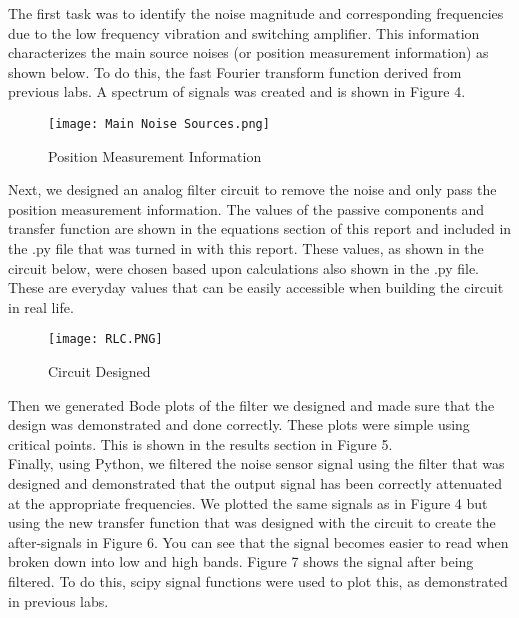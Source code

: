 \documentclass[12pt]{report}
\begin{document}
\noindent The first task was to identify the noise magnitude and corresponding frequencies due to the low frequency vibration and switching amplifier. This information characterizes the main source noises (or position measurement information) as shown below. To do this, the fast Fourier transform function derived from previous labs. A spectrum of signals was created and is shown in Figure 4. \\

\newpage 

\begin{figure}[ht]
\begin{center}
\texttt{[image: Main Noise Sources.png]}
\caption{Position Measurement Information}
\end{center}
\end{figure}


\noindent Next, we designed an analog filter circuit to remove the noise and only pass the position measurement information. The values of the passive components and transfer function are shown in the equations section of this report and included in the .py file that was turned in with this report. These values, as shown in the circuit below, were chosen based upon calculations also shown in the .py file. These are everyday values that can be easily accessible when building the circuit in real life. \\

\newpage

\begin{figure}[ht]
\begin{center}
\texttt{[image: RLC.PNG]}
\caption{Circuit Designed}
\end{center}
\end{figure}

\noindent Then we generated Bode plots of the filter we designed and made sure that the design was demonstrated and done correctly. These plots were simple using critical points. This is shown in the results section in Figure 5.\\ 

\noindent Finally, using Python, we filtered the noise sensor signal using the filter that was designed and demonstrated that the output signal has been correctly attenuated at the appropriate frequencies. We plotted the same signals as in Figure 4 but using the new transfer function that was designed with the circuit to create the after-signals in Figure 6. You can see that the signal becomes easier to read when broken down into low and high bands. Figure 7 shows the signal after being filtered. To do this, scipy signal functions were used to plot this, as demonstrated in previous labs. 
\end{document}
